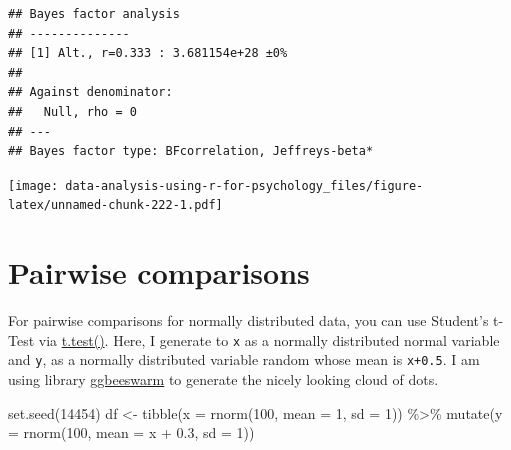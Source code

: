 \documentclass[
]{book}
\newenvironment{Shaded}{\begin{snugshade}}{\end{snugshade}}
\newcommand{\AttributeTok}[1]{\textcolor[rgb]{0.77,0.63,0.00}{#1}}
\newcommand{\ConstantTok}[1]{\textcolor[rgb]{0.00,0.00,0.00}{#1}}
\newcommand{\DecValTok}[1]{\textcolor[rgb]{0.00,0.00,0.81}{#1}}
\newcommand{\FloatTok}[1]{\textcolor[rgb]{0.00,0.00,0.81}{#1}}
\newcommand{\FunctionTok}[1]{\textcolor[rgb]{0.00,0.00,0.00}{#1}}
\newcommand{\NormalTok}[1]{#1}
\newcommand{\OtherTok}[1]{\textcolor[rgb]{0.56,0.35,0.01}{#1}}
\newcommand{\SpecialCharTok}[1]{\textcolor[rgb]{0.00,0.00,0.00}{#1}}
\newcommand{\StringTok}[1]{\textcolor[rgb]{0.31,0.60,0.02}{#1}}
\begin{document}
\begin{verbatim}
## Bayes factor analysis
## --------------
## [1] Alt., r=0.333 : 3.681154e+28 ±0%
## 
## Against denominator:
##   Null, rho = 0 
## ---
## Bayes factor type: BFcorrelation, Jeffreys-beta*
\end{verbatim}

\begin{Shaded}
\end{Shaded}

\texttt{[image: data-analysis-using-r-for-psychology\_files/figure-latex/unnamed-chunk-222-1.pdf]}

\hypertarget{pairwise-comparisons}{%
\section{Pairwise comparisons}\label{pairwise-comparisons}}

For pairwise comparisons for normally distributed data, you can use Student's t-Test via \href{https://stat.ethz.ch/R-manual/R-devel/library/stats/html/t.test.html}{t.test()}. Here, I generate to \texttt{x} as a normally distributed normal variable and \texttt{y}, as a normally distributed variable random whose mean is \texttt{x+0.5}. I am using library \href{https://github.com/eclarke/ggbeeswarm}{ggbeeswarm} to generate the nicely looking cloud of dots.

\begin{Shaded}
\begin{Highlighting}[]
\FunctionTok{set.seed}\NormalTok{(}\DecValTok{14454}\NormalTok{)}
\NormalTok{df }\OtherTok{\textless{}{-}} 
  \FunctionTok{tibble}\NormalTok{(}\AttributeTok{x =} \FunctionTok{rnorm}\NormalTok{(}\DecValTok{100}\NormalTok{, }\AttributeTok{mean =} \DecValTok{1}\NormalTok{, }\AttributeTok{sd =} \DecValTok{1}\NormalTok{)) }\SpecialCharTok{\%\textgreater{}\%}
  \FunctionTok{mutate}\NormalTok{(}\AttributeTok{y =} \FunctionTok{rnorm}\NormalTok{(}\DecValTok{100}\NormalTok{, }\AttributeTok{mean =}\NormalTok{ x }\SpecialCharTok{+} \FloatTok{0.3}\NormalTok{, }\AttributeTok{sd =} \DecValTok{1}\NormalTok{))}
\end{Highlighting}
\end{Shaded}
\end{document}

